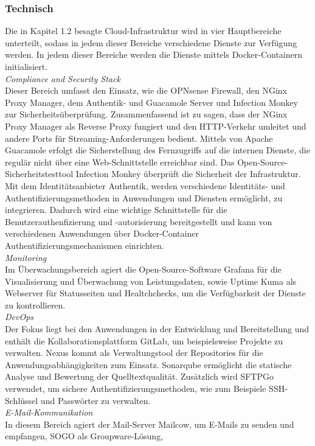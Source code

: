 \subsubsection{Technisch}
\label{sec:Technisch}
Die in Kapitel 1.2 besagte Cloud-Infrastruktur wird in vier  
Hauptbereiche unterteilt, sodass in jedem dieser Bereiche verschiedene Dienste zur Verfügung werden. In jedem dieser Bereiche 
werden die Dienste mittels Docker-Containern initialisiert.
\\\textit{Compliance and Security Stack}
\\Dieser Bereich umfasst den Einsatz, wie die OPNsense Firewall, den NGinx Proxy Manager, dem Authentik- und Guacamole Server 
und Infection Monkey zur Sicherheitsüberprüfung. Zusammenfassend ist zu sagen, dass der NGinx Proxy Manager als Reverse Proxy 
fungiert und den HTTP-Verkehr umleitet und andere Ports für Streaming-Anforderungen bedient. Mittels von Apache Guacamole 
erfolgt die Sicherstellung des Fernzugriffs auf die internen Dienste, die regulär nicht über eine Web-Schnittstelle erreichbar sind.
Das Open-Source-Sicherheitstesttool Infection Monkey überprüft die Sicherheit der Infrastruktur. 
Mit dem Identitätsanbieter Authentik, werden verschiedene Identitäts- und Authentifizierungsmethoden in 
Anwendungen und Diensten ermöglicht, zu integrieren. Dadurch wird eine wichtige Schnittstelle für die 
Benutzerauthenfizierung und -autorisierung bereitgestellt und kann von verschiedenen Anwendungen über 
Docker-Container Authentifizierungsmechanismen einrichten.
\\\textit{Monitoring}
\\Im Überwachungsbereich agiert die Open-Source-Software Grafana für die Visualisierung und Überwachung von Leistungsdaten, sowie 
Uptime Kuma als Webserver für Statusseiten und Healtchchecks, um die Verfügbarkeit der Dienste zu kontrollieren. 
\\\textit{DevOps}
\\Der Fokus liegt bei den Anwendungen in der Entwicklung und Bereitstellung und enthält die 
Kollaborationsplattform GitLab, um beispielsweise Projekte zu verwalten. 
Nexus kommt als Verwaltungstool der Repositories für die Anwendungsabhängigkeiten zum Einsatz. Sonarqube ermöglicht die 
statische Analyse und Bewertung der Quelltextqualität. Zusätzlich wird SFTPGo verwendet, um sichere Authentifizierungsmethoden, 
wie zum Beispiele SSH-Schlüssel und Passwörter zu verwalten.
\\\textit{E-Mail-Kommunikation}
\\In diesem Bereich agiert der Mail-Server Mailcow, um E-Mails zu senden und empfangen, SOGO als Groupware-Lösung, 
